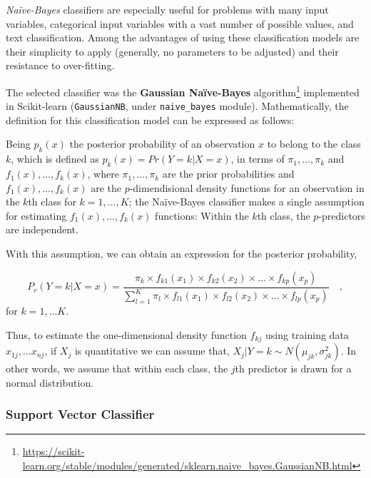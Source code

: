 \documentclass[a4paper, 12pt]{book}
\begin{document}
\textit{Naïve-Bayes} classifiers are especially useful for problems with many input variables, categorical input variables with a vast number of possible values, and text classification. Among the advantages of using these classification models are their simplicity to apply (generally, no parameters to be adjusted) and their resistance to over-fitting.

The selected classifier was the \textbf{Gaussian Naïve-Bayes} algorithm\footnote{\url{https://scikit-learn.org/stable/modules/generated/sklearn.naive_bayes.GaussianNB.html}} implemented in Scikit-learn (\texttt{GaussianNB}, under \texttt{naive\_bayes} module). Mathematically, the definition for this classification model can be expressed as follows:

Being $p_{k}(x)$ the posterior probability of an observation $x$ to belong to the class $k$, which is defined as $p_{k}(x)= Pr(Y = k|X = x)$, in terms of $\pi_{1},...,\pi_{k}$ and $f_{1}(x),...,f_{k}(x)$, where $\pi_{1},...,\pi_{k}$ are the prior probabilities and $f_{1}(x),...,f_{k}(x)$ are the $p$-dimendisional density functions for an observation in the $k$th class for $k=1,...,K$; the Naïve-Bayes classifier makes a single assumption for estimating $f_{1}(x),...,f_{k}(x)$ functions: Within the $k$th class, the $p$-predictors are independent.

With this assumption, we can obtain an expression for the posterior probability,

\begin{center}
\begin{equation}
P_{r}(Y = k|X = x) = \frac{\pi_{k} \times f_{k1}(x_{1}) \times f_{k2}(x_{2}) \times ... \times f_{kp}(x_{p})}{\sum_{l=1}^{K} \pi_{l} \times f_{l1}(x_{1}) \times f_{l2}(x_{2}) \times ... \times f_{lp}(x_{p})} \quad,
\end{equation}
for $k = 1,...K$.
\end{center}

Thus, to estimate the one-dimensional density function $f_{kj}$ using training data $x_{1j},...x_{nj}$, if $X_{j}$ is quantitative we can assume that, $X_{j}|Y=k \sim N(\mu_{jk}, \sigma^2_{jk})$. In other words, we assume that within each class, the $j$th predictor is drawn for a normal distribution.

\subsubsection{Support Vector Classifier}
\label{sssec:linear-svms}
\end{document}

